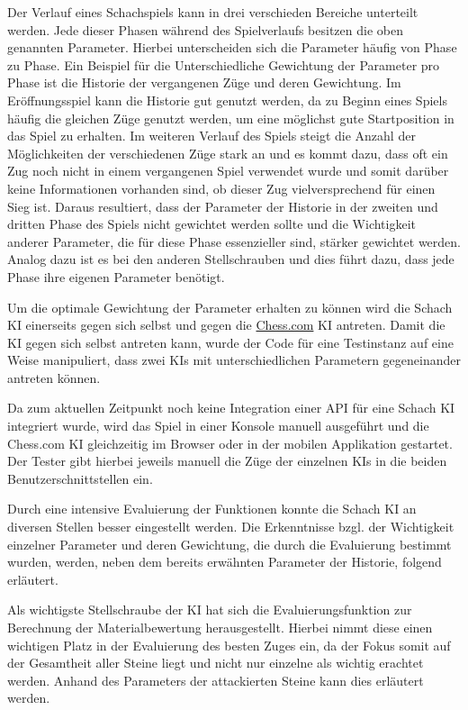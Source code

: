 Der Verlauf eines Schachspiels kann in drei verschieden Bereiche unterteilt werden. Jede dieser Phasen während des Spielverlaufs besitzen die oben genannten Parameter. Hierbei unterscheiden sich die Parameter häufig von Phase zu Phase. Ein Beispiel für die Unterschiedliche Gewichtung der Parameter pro Phase ist die Historie der vergangenen Züge und deren Gewichtung. Im Eröffnungsspiel kann die Historie gut genutzt werden, da zu Beginn eines Spiels häufig die gleichen Züge genutzt werden, um eine möglichst gute Startposition in das Spiel zu erhalten. Im weiteren Verlauf des Spiels steigt die Anzahl der Möglichkeiten der verschiedenen Züge stark an und es kommt dazu, dass oft ein Zug noch nicht in einem vergangenen Spiel verwendet wurde und somit darüber keine Informationen vorhanden sind, ob dieser Zug vielversprechend für einen Sieg ist. Daraus resultiert, dass der Parameter der Historie in der zweiten und dritten Phase des Spiels nicht gewichtet werden sollte und die Wichtigkeit anderer Parameter, die für diese Phase essenzieller sind, stärker gewichtet werden. Analog dazu ist es bei den anderen Stellschrauben und dies führt dazu, dass jede Phase ihre eigenen Parameter benötigt. 

Um die optimale Gewichtung der Parameter erhalten zu können wird die Schach KI einerseits gegen sich selbst und gegen die \href{https://www.chess.com}{Chess.com} KI antreten. Damit die KI gegen sich selbst antreten kann, wurde der Code für eine Testinstanz auf eine Weise manipuliert, dass zwei KIs mit unterschiedlichen Parametern gegeneinander antreten können. 

Da zum aktuellen Zeitpunkt noch keine Integration einer API für eine Schach KI integriert wurde, wird das Spiel in einer Konsole manuell ausgeführt und die Chess.com KI gleichzeitig im Browser oder in der mobilen Applikation gestartet. Der Tester gibt hierbei jeweils manuell die Züge der einzelnen KIs in die beiden Benutzerschnittstellen ein.

Durch eine intensive Evaluierung der Funktionen konnte die Schach KI an diversen Stellen besser eingestellt werden. Die Erkenntnisse bzgl. der Wichtigkeit einzelner Parameter und deren Gewichtung, die durch die Evaluierung bestimmt wurden, werden, neben dem bereits erwähnten Parameter der Historie, folgend erläutert.

Als wichtigste Stellschraube der KI hat sich die Evaluierungsfunktion zur Berechnung der Materialbewertung herausgestellt. Hierbei nimmt diese einen wichtigen Platz in der Evaluierung des besten Zuges ein, da der Fokus somit auf der Gesamtheit aller Steine liegt und nicht nur einzelne als wichtig erachtet werden. Anhand des Parameters der attackierten Steine kann dies erläutert werden.

